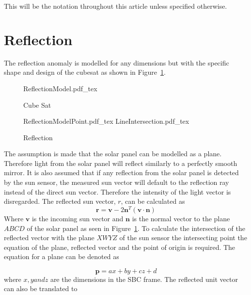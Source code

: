 \documentclass[letterpaper, 10 pt, conference]{ieeeconf}  %
\begin{document}
This will be the notation throughout this article unless specified otherwise. 

\section{Reflection}
\label{section:Reflection}
The reflection anomaly is modelled for any dimensions but with the specific shape and design of the cubesat as shown in Figure~\ref{fig:CubeSat}.

\begin{figure}[!htb]
	\centering
	\def\svgwidth{7cm}
	{ReflectionModel.pdf_tex}
	\caption{Cube Sat}
	\label{fig:CubeSat}
\end{figure}

\begin{figure*}[!hbt]
	\centering
	\def\svgwidth{7cm}
	{ReflectionModelPoint.pdf_tex}
	\centering
	\def\svgwidth{7cm}
	{LineIntersection.pdf_tex}
	\caption{Reflection}
	\label{fig:LineIntersection}
\end{figure*}

The assumption is made that the solar panel can be modelled as a plane. Therefore light from the solar panel will reflect similarly to a perfectly smooth mirror. It is also assumed that if any reflection from the solar panel is detected by the sun sensor, the measured sun vector will default to the reflection ray instead of the direct sun vector. Therefore the intensity of the light vector is disregarded. The reflected sun vector, $r$, can be calculated as
\begin{equation}
	\mathbf{r} = \mathbf{v} - 2\mathbf{n}^T(\mathbf{v} \cdot \mathbf{n})
\end{equation}
Where $\mathbf{v}$ is the incoming sun vector and $\mathbf{n}$ is the normal vector to the plane $ABCD$ of the solar panel as seen in Figure~\ref{fig:CubeSat}. To calculate the intersection of the reflected vector with the plane $XWYZ$ of the sun sensor the intersecting point the equation of the plane, reflected vector and the point of origin is required. The equation for a plane can be denoted as 

\begin{equation}
	\mathbf{p} = ax + by + cz + d
	\label{eq:Plane}
\end{equation}
where $x, y and z$ are the dimensions in the SBC frame. The reflected unit vector can also be translated to 
\end{document}
